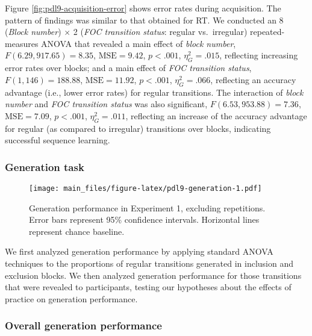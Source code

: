 \documentclass[man]{apa6}
\theoremstyle{definition}
\theoremstyle{definition}
\theoremstyle{definition}
\theoremstyle{remark}
\begin{document}
Figure \ref{fig:pdl9-acquisition-error} shows error rates during
acquisition. The pattern of findings was similar to that obtained for
RT. We conducted an 8 (\emph{Block number}) \(\times\) 2 (\emph{FOC
transition status}: regular vs.~irregular) repeated-measures ANOVA that
revealed a main effect of \emph{block number},
\(F(6.29, 917.65) = 8.35\), \(\mathrm{MSE} = 9.42\), \(p < .001\),
\(\eta^2_G = .015\), reflecting increasing error rates over blocks; and
a main effect of \emph{FOC transition status}, \(F(1, 146) = 188.88\),
\(\mathrm{MSE} = 11.92\), \(p < .001\), \(\eta^2_G = .066\), reflecting
an accuracy advantage (i.e., lower error rates) for regular transitions.
The interaction of \emph{block number} and \emph{FOC transition status}
was also significant, \(F(6.53, 953.88) = 7.36\),
\(\mathrm{MSE} = 7.09\), \(p < .001\), \(\eta^2_G = .011\), reflecting
an increase of the accuracy advantage for regular (as compared to
irregular) transitions over blocks, indicating successful sequence
learning.

\subsubsection{Generation task}\label{generation-task}

\begin{figure}[htbp]
\centering
\texttt{[image: main\_files/figure-latex/pdl9-generation-1.pdf]}
\caption{\label{fig:pdl9-generation}Generation performance in Experiment 1,
excluding repetitions. Error bars represent 95\% confidence intervals.
Horizontal lines represent chance baseline.}
\end{figure}

We first analyzed generation performance by applying standard ANOVA
techniques to the proportions of regular transitions generated in
inclusion and exclusion blocks. We then analyzed generation performance
for those transitions that were revealed to participants, testing our
hypotheses about the effects of practice on generation performance.

\subsubsection{Overall generation
performance}\label{overall-generation-performance}
\end{document}
